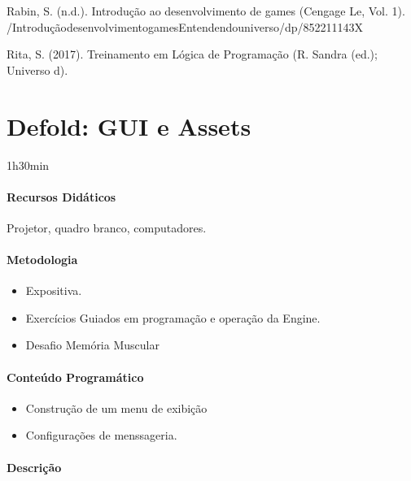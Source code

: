 \documentclass[letterpaper,10pt,brazil]{sphinxmanual}
\begin{document}
\sphinxAtStartPar
Rabin, S. (n.d.). Introdução ao desenvolvimento de games (Cengage Le, Vol. 1).
/Introdução\sphinxhyphen{}desenvolvimento\sphinxhyphen{}games\sphinxhyphen{}Entendendo\sphinxhyphen{}universo/dp/852211143X

\sphinxAtStartPar
Rita, S. (2017). Treinamento em Lógica de Programação (R. Sandra (ed.); Universo d).

\sphinxstepscope


\chapter{Defold: GUI \sphinxhyphen{} e Assets}
\label{\detokenize{modelo_aula_07:defold-gui-e-assets}}\label{\detokenize{modelo_aula_07::doc}}
\sphinxAtStartPar
{} 1h30min
\subsubsection*{Recursos Didáticos}

\sphinxAtStartPar
Projetor, quadro branco, computadores.
\subsubsection*{Metodologia}
\begin{itemize}
\item {} 
\sphinxAtStartPar
Expositiva.

\item {} 
\sphinxAtStartPar
Exercícios Guiados em programação e operação da Engine.

\item {} 
\sphinxAtStartPar
Desafio \sphinxhyphen{} Memória Muscular

\end{itemize}
\subsubsection*{Conteúdo Programático}
\begin{itemize}
\item {} 
\sphinxAtStartPar
Construção de um menu de exibição

\item {} 
\sphinxAtStartPar
Configurações de menssageria.

\end{itemize}
\subsubsection*{Descrição}
\end{document}
